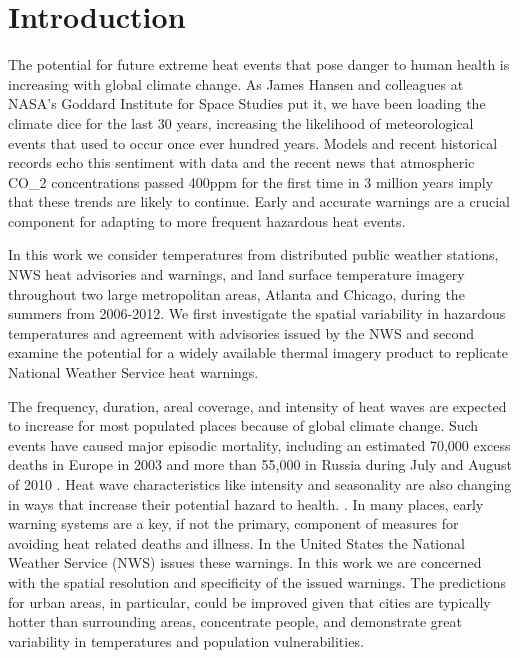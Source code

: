 \documentclass{ametsoc}
\begin{document}
\section{Introduction}\label{section:intro}
The potential for future extreme heat events that pose danger to human health is increasing with global climate change. As James Hansen and colleagues at NASA's Goddard Institute for Space Studies put it, we have been loading the climate dice for the last 30 years, increasing the likelihood of meteorological events that used to occur once ever hundred years\citep{Hansen}. Models and recent historical records echo this sentiment with data and the recent news that atmospheric CO\_{2} concentrations passed 400ppm for the first time in 3 million years imply that these trends are likely to continue.  Early and accurate warnings are a crucial component for adapting to more frequent hazardous heat events.

In this work we consider temperatures from distributed public weather stations, NWS heat advisories and warnings, and land surface temperature imagery throughout two large metropolitan areas, Atlanta and Chicago, during the summers from 2006-2012. We first investigate the spatial variability in hazardous temperatures and agreement with advisories issued by the NWS and second examine the potential for a widely available thermal imagery product to replicate National Weather Service heat warnings.

The frequency, duration, areal coverage, and intensity of heat waves are expected to increase for most populated places because of global climate change\citep{Meehl2004,Easterling2000}. Such events have caused major episodic mortality, including an estimated 70,000 excess deaths in Europe in 2003 \citep{Robine2008} and more than 55,000 in Russia during July and August of 2010 \citep{Guha2011,Revich2011}. Heat wave characteristics like intensity and seasonality are also changing in ways that increase their potential hazard to health. \citep{Habeeb}. In many places, early warning systems are a key, if not the primary, component of measures for avoiding heat related deaths and illness. In the United States the National Weather Service (NWS) issues these warnings. In this work we are concerned with the spatial resolution and specificity of the issued warnings. The predictions for urban areas, in particular, could be improved given that cities are typically hotter than surrounding areas, concentrate people, and demonstrate great variability in temperatures and population vulnerabilities.
\end{document}
